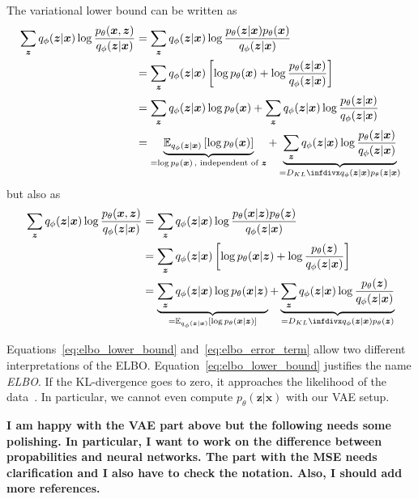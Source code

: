 The variational lower bound can be written as
\begin{align}
    \sum_{\bm{z}} q_\phi(\bm{z}|\bm{x}) \log \frac{p_\theta(\bm{x},\bm{z})}{q_\phi(\bm{z}|\bm{x})} &= \sum_{\bm{z}} q_\phi(\bm{z}|\bm{x}) \log \frac{p_\theta(\bm{z}|\bm{x})p_\theta(\bm{x})}{q_\phi(\bm{z}|\bm{x})}\\
    &= \sum_{\bm{z}} q_\phi(\bm{z}|\bm{x}) \left[ \log p_\theta(\bm{x}) + \log \frac{p_\theta(\bm{z}|\bm{x})}{q_\phi(\bm{z}|\bm{x})} \right]\\
    &= \sum_{\bm{z}} q_\phi(\bm{z}|\bm{x})\log p_\theta(\bm{x}) + \sum_{\bm{z}} q_\phi(\bm{z}|\bm{x})\log \frac{p_\theta(\bm{z}|\bm{x})}{q_\phi(\bm{z}|\bm{x})}\\
    &= \underbrace{\mathbb{E}_{q_\phi(\bm{z}|\bm{x})} \left[ \log p_\theta(\bm{x}) \right]}_{=\log p_\theta(\bm{x})\, \text{, independent of $\bm{z}$}} + \underbrace{\sum_{\bm{z}} q_\phi(\bm{z}|\bm{x})\log \frac{p_\theta(\bm{z}|\bm{x})}{q_\phi(\bm{z}|\bm{x})}}_{=\kldiv{q_\phi(\bm{z}|\bm{x})}{p_\theta(\bm{z}|\bm{x})}} \label{eq:elbo_lower_bound}
\end{align}
but also as
\begin{align}
    \sum_{\bm{z}} q_\phi(\bm{z}|\bm{x}) \log \frac{p_\theta(\bm{x},\bm{z})}{q_\phi(\bm{z}|\bm{x})} &= \sum_{\bm{z}} q_\phi(\bm{z}|\bm{x}) \log \frac{p_\theta(\bm{x}|\bm{z})p_\theta(\bm{z})}{q_\phi(\bm{z}|\bm{x})}\\
    &= \sum_{\bm{z}} q_\phi(\bm{z}|\bm{x}) \left[ \log p_\theta(\bm{x}|\bm{z}) + \log \frac{p_\theta(\bm{z})}{q_\phi(\bm{z}|\bm{x})} \right]\\
    &= \underbrace{\sum_{\bm{z}} q_\phi(\bm{z}|\bm{x})\log p_\theta(\bm{x}|\bm{z})}_{=\mathbb{E}_{q_\phi(\bm{z}|\bm{x})}\left[ \log p_\theta(\bm{x}|\bm{z}) \right]} + \underbrace{\sum_{\bm{z}} q_\phi(\bm{z}|\bm{x})\log \frac{p_\theta(\bm{z})}{q_\phi(\bm{z}|\bm{x})}}_{=\kldiv{q_\phi(\bm{z}|\bm{x})}{p_\theta(\bm{z})}} \label{eq:elbo_error_term}
\end{align}

Equations~\ref{eq:elbo_lower_bound} and~\ref{eq:elbo_error_term} allow two different interpretations of the \ac{ELBO}.
Equation~\ref{eq:elbo_lower_bound} justifies the name \textit{\acl{ELBO}}.
If the \ac{KL-divergence} goes to zero, it approaches the likelihood of the data~\citep[p. 18]{kingma2019introduction}.
In particular, we cannot even compute $p_\theta(\bm{z}|\bm{x})$ with our \ac{VAE} setup.

\textbf{I am happy with the VAE part above but the following needs some polishing.
In particular, I want to work on the difference between propabilities and neural networks.
The part with the MSE needs clarification and I also have to check the notation.
Also, I should add more references.}

